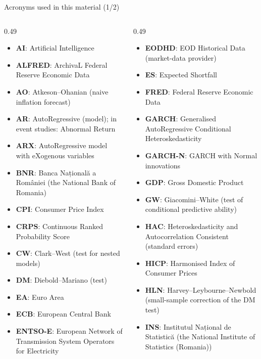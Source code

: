\begin{frame}{Acronyms used in this material (1/2)}
\begin{columns}[T]
\begin{column}{0.49\textwidth}
\begin{itemize}\setlength{\itemsep}{0pt}
    \item \textbf{AI}: Artificial Intelligence
    \item \textbf{ALFRED}: ArchivaL Federal Reserve Economic Data
    \item \textbf{AO}: Atkeson–Ohanian (naive inflation forecast)
    \item \textbf{AR}: AutoRegressive (model); in event studies: Abnormal Return
    \item \textbf{ARX}: AutoRegressive model with eXogenous variables
    \item \textbf{BNR}: Banca Națională a României (the National Bank of Romania)
    \item \textbf{CPI}: Consumer Price Index
    \item \textbf{CRPS}: Continuous Ranked Probability Score
    \item \textbf{CW}: Clark–West (test for nested models)
    \item \textbf{DM}: Diebold–Mariano (test)
    \item \textbf{EA}: Euro Area
    \item \textbf{ECB}: European Central Bank
    \item \textbf{ENTSO-E}: European Network of Transmission System Operators for Electricity
\end{itemize}
\end{column}
\begin{column}{0.49\textwidth}
\begin{itemize}\setlength{\itemsep}{0pt}
    \item \textbf{EODHD}: EOD Historical Data (market-data provider)
    \item \textbf{ES}: Expected Shortfall
    \item \textbf{FRED}: Federal Reserve Economic Data
    \item \textbf{GARCH}: Generalised AutoRegressive Conditional Heteroskedasticity
    \item \textbf{GARCH-N}: GARCH with Normal innovations
    \item \textbf{GDP}: Gross Domestic Product
    \item \textbf{GW}: Giacomini–White (test of conditional predictive ability)
    \item \textbf{HAC}: Heteroskedasticity and Autocorrelation Consistent (standard errors)
    \item \textbf{HICP}: Harmonised Index of Consumer Prices
    \item \textbf{HLN}: Harvey–Leybourne–Newbold (small-sample correction of the DM test)
    \item \textbf{INS}: Institutul Național de Statistică (the National Institute of Statistics (Romania))
\end{itemize}
\end{column}
\end{columns}
\end{frame}

